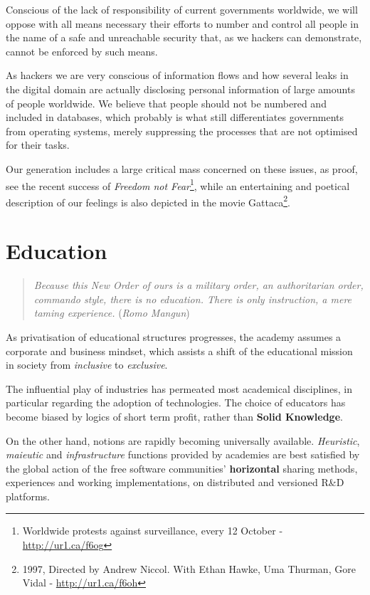 Conscious of the lack of responsibility of current governments worldwide, we
will oppose with all means necessary their ef\hbox{}forts to number and control
all people in the name of a safe and unreachable security that, as we hackers
can demonstrate, cannot be enforced by such means.

As hackers we are very conscious of information f\hbox{}lows and how several
leaks in the digital domain are actually disclosing personal information of
large amounts of people worldwide. We believe that people should not be numbered
and included in databases, which probably is what still dif\hbox{}ferentiates
governments from operating systems, merely suppressing the processes that are
not optimised for their tasks.

Our generation includes a large critical mass concerned on these issues, as
proof, see the recent success of \textit{Freedom not Fear}\footnote{Worldwide
protests against surveillance, every 12 October - \url{http://ur1.ca/f6og}},
while an entertaining and poetical description of our feelings is also depicted
in the movie Gattaca\footnote{1997, Directed by Andrew Niccol. With Ethan Hawke,
Uma Thurman, Gore Vidal - \url{http://ur1.ca/f6oh}}.


\section{Education}
\label{s:weaver_birds:education}


\begin{quote}
\textit{Because this New Order of ours is a military order, an authoritarian
order, commando style, there is no education. There is only instruction, a mere
taming experience.} (\textit{Romo Mangun})
\end{quote}

As privatisation of educational structures progresses, the academy assumes a
corporate and business mindset, which assists a shift of the educational mission
in society from \textit{inclusive} to \textit{exclusive}.

The inf\hbox{}luential play of industries has permeated most academical
disciplines, in particular regarding the adoption of technologies. The choice of
educators has become biased by logics of short term prof\hbox{}it, rather than
\textbf{Solid Knowledge}.

On the other hand, notions are rapidly becoming universally available.
\textit{Heuristic}, \textit{maieutic} and \textit{infrastructure} functions
provided by academies are best satisf\hbox{}ied by the global action of the free
software communities' \textbf{horizontal} sharing methods, experiences and
working implementations, on distributed and versioned R\&D platforms.

